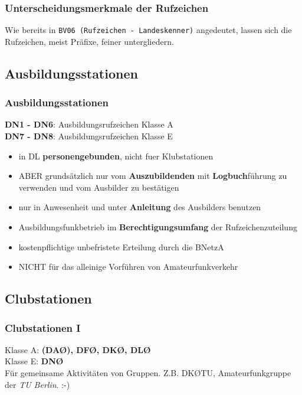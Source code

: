 \begin{frame}
    \frametitle{Unterscheidungsmerkmale der Rufzeichen}

    Wie bereits in \texttt{BV06 (Rufzeichen - Landeskenner)} angedeutet, lassen
    sich die Rufzeichen, meist Präfixe, feiner untergliedern.

\end{frame}

\subsection{Ausbildungsstationen}

\begin{frame}
    \frametitle{Ausbildungsstationen}

    \textbf{DN1 - DN6}: Ausbildungsrufzeichen Klasse A \\
    \textbf{DN7 - DN8}: Ausbildungsrufzeichen Klasse E
    
    \begin{itemize}[<+->]
        \item in DL \textbf{personengebunden}, nicht fuer Klubstationen
        \item ABER grundsätzlich nur vom \textbf{Auszubildenden} mit
              \textbf{Logbuch}führung zu verwenden und vom Ausbilder zu bestätigen
        \item nur in Anwesenheit und unter \textbf{Anleitung} des Ausbilders benutzen
        \item Ausbildungsfunkbetrieb im \textbf{Berechtigungsumfang} der
              Rufzeichenzuteilung
        \item kostenpflichtige unbefristete Erteilung durch die BNetzA
        \item NICHT für das alleinige Vorführen von Amateurfunkverkehr
    \end{itemize}

\end{frame}

\subsection{Clubstationen}

\begin{frame}
    \frametitle{Clubstationen I}

    Klasse A: \textbf{(DAØ), DFØ, DKØ, DLØ} \\
    Klasse E: \textbf{DNØ} \\[3em]

    Für gemeinsame Aktivitäten von Gruppen. Z.B. DKØTU, Amateurfunkgruppe der
    \emph{TU Berlin}. :-)

\end{frame}

